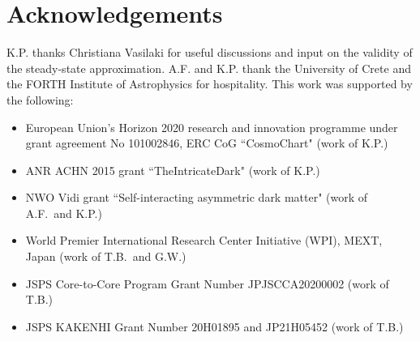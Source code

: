 \documentclass[preprint,5p,twocolumn]{elsarticle}
\begin{document}
\section*{Acknowledgements}

K.P. thanks Christiana Vasilaki for useful discussions and input on the validity of the steady-state approximation.  
A.F. and K.P. thank the University of Crete and the FORTH Institute of Astrophysics for hospitality. This work was supported by the following:
\begin{itemize}
\item 
European Union’s Horizon 2020 research and innovation programme under grant agreement No 101002846, ERC CoG ``CosmoChart" (work of K.P.)
\item 
ANR ACHN 2015 grant ``TheIntricateDark" (work of K.P.)
\item 
NWO Vidi grant ``Self-interacting asymmetric dark matter" (work of A.F.~and K.P.)
\item
World Premier International Research Center Initiative (WPI), MEXT, Japan (work of T.B.~and G.W.) 
\item 
JSPS Core-to-Core Program Grant Number JPJSCCA20200002 (work of T.B.)
\item 
JSPS KAKENHI Grant Number 20H01895 and JP21H05452 (work of T.B.)
\end{itemize}



\end{document}
